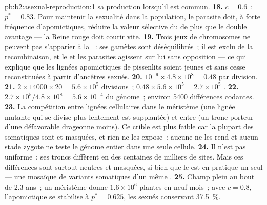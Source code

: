 \begin{solution}{pb:b2:asexual-reproduction:1}
sa production lorsqu'il est commun.
\textbf{18.} $c = 0.6$~: $p^* = 0.83$. Pour maintenir la sexualité dans
la population, le parasite doit, à forte fréquence d'apomictiques,
réduire la valeur sélective du  de plus que le double avantage ---
la Reine rouge doit courir vite.
\textbf{19.} Trois jeux de chromosomes ne peuvent pas s'apparier à la
~: ses gamètes sont déséquilibrés~; il est exclu de la
recombinaison, et le  et les parasites agissent sur lui
sans opposition --- ce qui explique que les lignées apomictiques de
pissenlits soient jeunes et sans cesse reconstituées à partir d'ancêtres
sexués.
\textbf{20.} $10^{-9}\times 4.8\times 10^{8} = 0.48$ par division.
\textbf{21.} $2\times \num{14000}\times 20 = 5.6\times 10^{5}$
divisions~; $0.48\times 5.6\times 10^{5} = 2.7\times 10^{5}$
.
\textbf{22.} $2.7\times 10^{5}/4.8\times 10^{8} = 5.6\times 10^{-4}$ du
génome~; environ \num{5400} différences codantes.
\textbf{23.} La compétition entre lignées cellulaires dans le méristème
(une lignée mutante qui se divise plus lentement est supplantée) et
entre  (un tronc porteur d'une  défavorable drageonne
moins). Ce crible est plus faible car la plupart des 
somatiques sont  et masquées, et rien ne les expose~:
aucune  ne les rend  et aucun stade zygote 
ne teste le génome entier dans une seule cellule.
\textbf{24.} Il n'est pas uniforme~: ses troncs diffèrent en des
centaines de milliers de sites. Mais ces différences sont surtout
neutres et masquées, si bien que le  est en pratique un seul
 --- une mosaïque de variants somatiques d'un même .
\textbf{25.} Champ plein au bout de 2.3 ans~; un méristème donne
$1.6\times 10^{6}$ plantes en neuf mois~; avec $c = 0.8$, l'apomictique
se stabilise à $p^* = 0.625$, les sexués conservant \qty{37.5}{\%}.
\end{solution}
